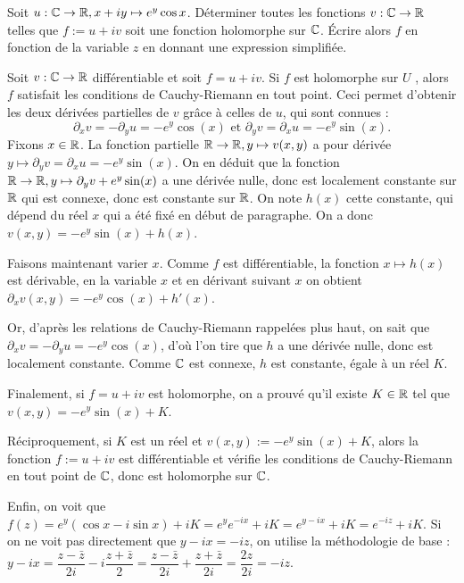 \begin{exo}
Soit $u : \mathbb{C}\to \mathbb{R},  x+iy \mapsto e^y\cos x$. 
Déterminer toutes les fonctions $v : \mathbb{C}\to \mathbb{R}$ telles que $f:=u+iv$ soit une fonction holomorphe sur $\mathbb{C}$. 
Écrire alors $f$ en fonction de la variable $z$ en donnant une expression simplifiée.
\begin{sol}
Soit $v : \mathbb{C}\to \mathbb{R}$ différentiable et soit $f=u+iv$. 
Si $f$ est holomorphe sur $U$ , alors $f$ satisfait les conditions de Cauchy-Riemann en tout point.
Ceci permet d'obtenir les deux dérivées partielles de $v$ grâce à celles de $u$, qui sont connues :
\[ \partial_x v = -\partial_y u = -e^y\cos(x) \text{ et } \partial_y v = \partial_x u = -e^y\sin(x).\]
Fixons $x\in \mathbb{R}$.  La fonction partielle $\mathbb{R}\to \mathbb{R}, y\mapsto v(x,y)$ a pour dérivée $y\mapsto \partial_y v = \partial_x u = -e^y\sin(x)$.  On en déduit que la fonction $\mathbb{R}\to\mathbb{R}, y\mapsto  \partial_y v + e^y\sin(x)$ a une dérivée nulle, donc est localement constante sur $\mathbb{R}$ qui est connexe, donc est constante sur $\mathbb{R}$. On note $h(x)$ cette constante, qui dépend du réel $x$ qui a été fixé en début de paragraphe. 
On a donc $v(x,y) = -e^y\sin(x) +h(x)$.


Faisons maintenant varier $x$. Comme $f$ est différentiable, la fonction $x\mapsto h(x)$ est dérivable, en la variable $x$ et en dérivant suivant $x$ on obtient $\partial_xv (x,y) = -e^y\cos(x)+h'(x)$.

Or, d'après les relations de Cauchy-Riemann rappelées plus haut, on sait que $ \partial_x v = -\partial_y u = -e^y\cos(x)$, d'où l'on tire que $h$ a une dérivée nulle, donc est localement constante. Comme $\mathbb{C}$ est connexe, $h$ est constante, égale à un réel $K$.

Finalement,  si $f=u+iv$ est holomorphe, on a prouvé qu'il existe $K\in \mathbb{R}$ tel que $v(x,y)=-e^y\sin(x)+K$.

Réciproquement, si $K$ est un réel et $v(x,y):=-e^y\sin(x)+K$, alors la fonction $f:=u+iv$ est différentiable et vérifie les conditions de Cauchy-Riemann en tout point de $\mathbb{C}$, donc est holomorphe sur $\mathbb{C}$.

Enfin, on voit que $f(z)=e^y(\cos x-i\sin x)+iK = e^ye^{-ix}+iK = e^{y-ix}+iK = e^{-iz}+iK$. 
Si on ne voit pas directement que $y-ix=-iz$, on utilise la méthodologie de base :
$y-ix = \dfrac{z-\bar z}{2i} - i \dfrac{z+\bar z}{2} 
=\dfrac{z-\bar z}{2i} + \dfrac{z+\bar z}{2i}
=  \dfrac{2z}{2i}= -iz$.
\end{sol}
\end{exo}

